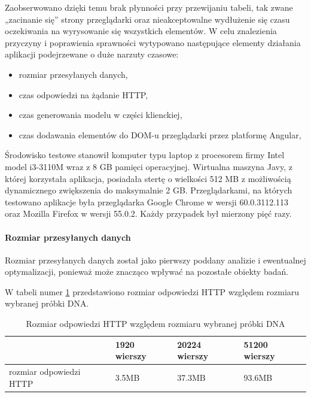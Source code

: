 \documentclass[a4paper,12pt,twoside]{article}
\begin{document}
Zaobserwowano dzięki temu brak płynności przy przewijaniu tabeli, tak zwane „zacinanie się” strony przeglądarki oraz nieakceptowalne wydłużenie się
czasu oczekiwania na wyrysowanie się wszystkich elementów.
W celu znalezienia przyczyny i poprawienia sprawności
wytypowano następujące elementy działania aplikacji podejrzewane o duże narzuty czasowe:

\begin{itemize}
\item rozmiar przesyłanych danych,
\item czas odpowiedzi na żądanie HTTP,
\item czas generowania modelu w części klienckiej,
\item czas dodawania elementów do DOM-u przeglądarki przez platformę Angular,
\end{itemize}

Środowisko testowe stanowił komputer typu laptop z
procesorem firmy Intel model i3-3110M wraz z 8 GB pamięci operacyjnej.
Wirtualna maszyna Javy, z której korzystała aplikacja, posiadała stertę
o wielkości 512 MB z możliwością dynamicznego zwiększenia do maksymalnie 2 GB.
Przeglądarkami, na których testowano aplikacje była przeglądarka
Google Chrome w wersji 60.0.3112.113 oraz Mozilla Firefox w wersji 55.0.2.
Każdy przypadek był mierzony pięć razy.
\newpage
\paragraph{Rozmiar przesyłanych danych}
Rozmiar przesyłanych danych został jako pierwszy poddany analizie i
ewentualnej optymalizacji, ponieważ może znacząco wpływać na pozostałe
obiekty badań.

W tabeli numer \ref{table:requestSizeNoOpt} przedstawiono rozmiar
odpowiedzi HTTP względem rozmiaru wybranej próbki DNA.

\begin{center}
\begin{table} [H]
\begin{tabular}{| p{4cm} | p{2.7cm} | p{2.7cm} | p{2.7cm}|}
\hline
& 1920 wierszy & 20224 wierszy & 51200 wierszy\\
\hline
rozmiar odpowiedzi HTTP& 3.5MB&37.3MB& 93.6MB\\ \hline
\end{tabular}

\caption{Rozmiar odpowiedzi HTTP względem rozmiaru wybranej próbki DNA}
\label{table:requestSizeNoOpt}
\end{table}
\end{center}
\end{document}
